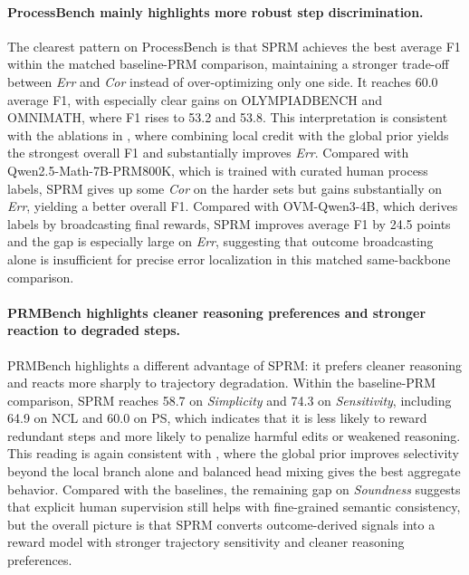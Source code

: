 \paragraph{ProcessBench mainly highlights more robust step discrimination.}
The clearest pattern on ProcessBench is that SPRM achieves the best average F1
within the matched baseline-PRM comparison, maintaining a stronger trade-off
between \textit{Err} and \textit{Cor} instead of over-optimizing only one side.
It reaches 60.0 average F1, with especially clear gains on OLYMPIADBENCH and
OMNIMATH, where F1 rises to 53.2 and 53.8.
This interpretation is consistent with the ablations in
, where combining local credit
with the global prior yields the strongest overall F1 and substantially
improves \textit{Err}.
Compared with Qwen2.5-Math-7B-PRM800K, which is trained with curated human
process labels, SPRM gives up some \textit{Cor} on the harder sets but gains
substantially on \textit{Err}, yielding a better overall F1.
Compared with OVM-Qwen3-4B, which derives labels by broadcasting final rewards,
SPRM improves average F1 by 24.5 points and the gap is especially large on
\textit{Err}, suggesting that outcome broadcasting alone is insufficient for
precise error localization in this matched same-backbone comparison.

\paragraph{PRMBench highlights cleaner reasoning preferences and stronger reaction to degraded steps.}
PRMBench highlights a different advantage of SPRM: it prefers cleaner
reasoning and reacts more sharply to trajectory degradation.
Within the baseline-PRM comparison, SPRM reaches 58.7 on \textit{Simplicity}
and 74.3 on \textit{Sensitivity}, including 64.9 on NCL and 60.0 on PS, which
indicates that it is less likely
to reward redundant steps and more likely to penalize harmful edits or weakened
reasoning.
This reading is again consistent with
, where the global prior improves
selectivity beyond the local branch alone and balanced head mixing gives the
best aggregate behavior.
Compared with the baselines, the remaining gap on \textit{Soundness} suggests
that explicit human supervision still helps with fine-grained semantic
consistency, but the overall picture is that SPRM converts outcome-derived
signals into a reward model with stronger trajectory sensitivity and cleaner
reasoning preferences.

